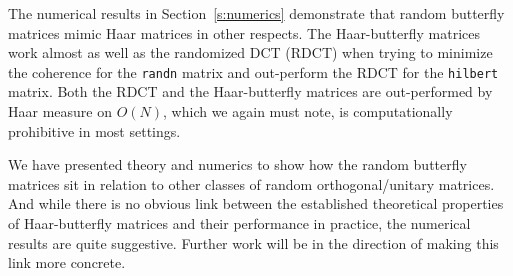 The numerical results in Section~\ref{s:numerics} demonstrate that random butterfly matrices mimic Haar matrices in other respects.  The Haar-butterfly matrices work almost as well as the randomized DCT (RDCT) when trying to minimize the coherence for the {\tt randn} matrix and out-perform the RDCT for the {\tt hilbert} matrix.  Both the RDCT and the Haar-butterfly matrices are out-performed by Haar measure on $O(N)$, which we again must note, is computationally prohibitive in most settings.

We have presented theory and numerics to show how the random butterfly matrices sit in relation to other classes of random orthogonal/unitary matrices. And while there is no obvious link between the established theoretical properties of Haar-butterfly matrices and their performance in practice, the numerical results are quite suggestive.  Further work will be in the direction of making this link more concrete.


